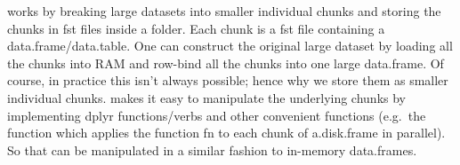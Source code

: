  works by breaking large datasets into smaller individual
chunks and storing the chunks in fst files inside a folder. Each chunk
is a fst file containing a data.frame/data.table. One can construct the
original large dataset by loading all the chunks into RAM and row-bind
all the chunks into one large data.frame. Of course, in practice this
isn't always possible; hence why we store them as smaller individual
chunks.  makes it easy to manipulate the underlying chunks
by implementing dplyr functions/verbs and other convenient functions
(e.g.~the  function which applies the function fn to each chunk of a.disk.frame in
parallel). So that  can be manipulated in a similar
fashion to in-memory data.frames.
